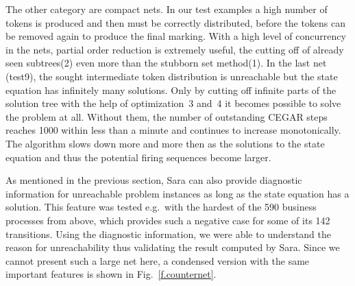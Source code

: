 \documentclass{LMCS}
\begin{document}
The other category are compact nets. In our test examples a high number of tokens is produced 
and then must be correctly distributed, before
the tokens can be removed again to produce the final marking.
With a high level of concurrency in the nets, partial order
reduction is extremely useful, the cutting off of already seen subtrees(2) even more than
the stubborn set method(1). In the last net (test9), the sought intermediate token distribution is
unreachable but the state equation has infinitely many solutions. Only by cutting off
infinite parts of the solution tree with the help of optimization~3 and~4 it becomes
possible to solve the problem at all. Without them, the number of outstanding CEGAR
steps reaches 1000 within less than a minute and continues to increase monotonically.
The algorithm slows down more and more then as the solutions to the state equation and thus
the potential firing sequences become larger.

As mentioned in the previous section, Sara can also provide diagnostic information
for unreachable problem instances as long as the state equation has a solution. This feature was tested
e.g.\ with the hardest of the 590 business processes from above, which provides such a negative
case for some of its 142 transitions. Using the diagnostic information, we were able to understand the
reason for unreachability thus validating the result computed by Sara.
Since we cannot present such a large net here, a condensed
version with the same important features is shown in Fig.~\ref{f.counternet}.
\end{document}
